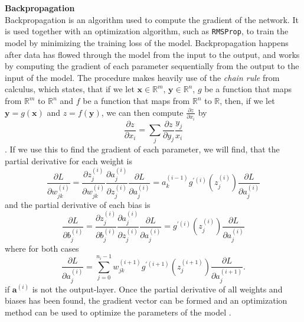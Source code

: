 \documentclass[./main.tex]{subfiles}
\begin{document}
\\
\\
\noindent \textbf{Backpropagation} \\
Backpropagation is an algorithm used to compute the gradient of the network. It is used together with an optimization algorithm, such as \texttt{RMSProp}, to train the model by minimizing the training loss of the model. Backpropagation happens after data has flowed through the model from the input to the output, and works by computing the gradient of each parameter sequentially from the output to the input of the model. The procedure makes heavily use of the \textit{chain rule} from calculus, which states, that if we let $\bm{x} \in \mathbb{R}^m$, $\bm{y} \in \mathbb{R}^n$, $g$ be a function that maps from $\mathbb{R}^m$ to $\mathbb{R}^n$ and $f$ be a function that maps from $\mathbb{R}^n$ to $\mathbb{R}$, then, if we let $\bm{y} = g(\bm{x})$ and $z = f(\bm{y})$, we can then compute $\frac{\partial z}{\partial x_i}$ by
$$\frac{\partial z}{\partial x_i} = \sum_j \frac{\partial z}{\partial y_j} \frac{y_j}{x_i}$$
\cite{DeepLearning}. If we use this to find the gradient of each parameter, we will find, that the partial derivative for each weight is
$$\frac{\partial L}{\partial w_{jk} ^{(i)}} = \frac{\partial z_j ^{(i)}}{\partial w_{jk} ^{(i)}} \frac{\partial a_j ^{(i)}}{\partial z_j ^{(i)}} \frac{\partial L}{\partial a_j ^{(i)}} = a_k ^{(i - 1)} g ^{\prime (i)} \left( z_j ^{(i)} \right) \frac{\partial L}{\partial a_j ^{(i)}}$$
and the partial derivative of each bias is
$$\frac{\partial L}{\partial b^{(i)} _j} = \frac{\partial z^{(i)} _j}{\partial b^{(i)} _j} \frac{\partial a_j ^{(i)}}{\partial z^{(i)} _j} \frac{\partial L}{\partial a_j ^{(i)}} = g^{\prime (i)} \left( z_j ^{(i)} \right) \frac{\partial L}{\partial a_j ^{(i)}}$$
where for both cases
$$ \frac{\partial L}{\partial a_j ^{(i)}} = \sum_{j = 0} ^{n_i - 1} w_{jk} ^{(i + 1)} g^{\prime (i + 1)} \left( z_j ^{(i + 1)} \right) \frac{\partial L}{\partial a_j ^{(i + 1)}}.$$
if $\bm{a}^{(i)}$ is not the output-layer. Once the partial derivative of all weights and biases has been found, the gradient vector can be formed and an optimization method can be used to optimize the parameters of the model \cite{3b1b_4}.
\end{document}
